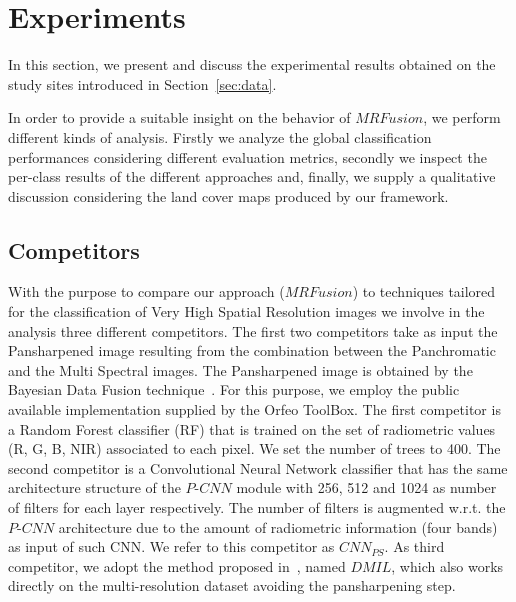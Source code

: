 \documentclass[journal]{IEEEtran}
\newcommand{\method}{$MRFusion$}
\begin{document}
\section{Experiments}
\label{sec:expe}
In this section, we present and discuss the experimental results obtained on the study sites introduced in Section~\ref{sec:data}.

In order to provide a suitable insight on the behavior of \method, we perform different kinds of analysis. Firstly we analyze the global classification performances considering different evaluation metrics, secondly we inspect the per-class results of the different approaches and, finally, we supply a qualitative discussion considering the land cover maps produced by our framework.

\subsection{Competitors}
With the purpose to compare our approach (\method{}) to techniques tailored for the classification of Very High Spatial Resolution images we involve in the analysis three different competitors. The first two competitors take as input the Pansharpened image resulting from the combination between the Panchromatic and the Multi Spectral images. The Pansharpened image is obtained by the Bayesian Data Fusion technique~\cite{4505280}. For this purpose, we employ the public available implementation supplied by the Orfeo ToolBox\cite{Grizonnet2017}. The first competitor is a  Random Forest classifier (RF) that is trained on the set of radiometric values (R, G, B, NIR) associated to each pixel. We set the number of trees to 400. The second competitor is a Convolutional Neural Network classifier that has the same architecture structure of the $P$-$CNN$ module with 256, 512 and 1024 as number of filters for each layer respectively. The number of filters is augmented w.r.t. the $P$-$CNN$ architecture due to the amount of radiometric information (four bands) as input of such CNN. We refer to this competitor as $CNN_{PS}$. As third competitor, we adopt the method proposed in~\cite{LiuJZZZLYT18}, named $DMIL$, which also works directly on the multi-resolution dataset avoiding the pansharpening step.
\end{document}
